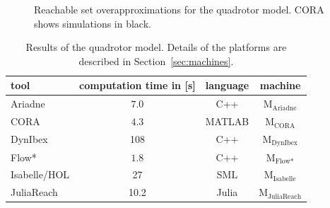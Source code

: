 \documentclass[EPiC]{easychair}
\begin{document}
\begin{figure}[htb]
{   \label{fig:quadrotor:flow*}}
\caption{Reachable set overapproximations for the quadrotor model. CORA shows simulations in black.}
\label{fig:quadrotor}
\end{figure}


\begin{table}[t]
	\setlength{\tabcolsep}{4pt}
	\renewcommand{\arraystretch}{1.2}
	\centering
	\caption{Results of the quadrotor model. Details of the platforms are described in Section~\ref{sec:machines}.}
	\begin{tabular}[c]{lccc}
	\hline
		 \textbf{tool} & \textbf{computation time in [s]} & \textbf{language} & \textbf{machine} \\
		 \hline
		 Ariadne & $7.0$ & C++ & M$_{\text{Ariadne}}$ \\
         CORA & $4.3$ & MATLAB & M$_{\text{CORA}}$ \\
         DynIbex & 108 & C++ & M$_{\text{DynIbex}}$ \\
         Flow* & $1.8$ & C++ & M$_{\text{Flow*}}$ \\
         Isabelle/HOL & 27 & SML & M$_{\text{Isabelle}}$ \\
         JuliaReach & 10.2 & Julia & M$_{\text{JuliaReach}}$ \\
		 \hline
	\end{tabular}
	\label{tab:compTimes:quadrotor}
\end{table}
\end{document}
